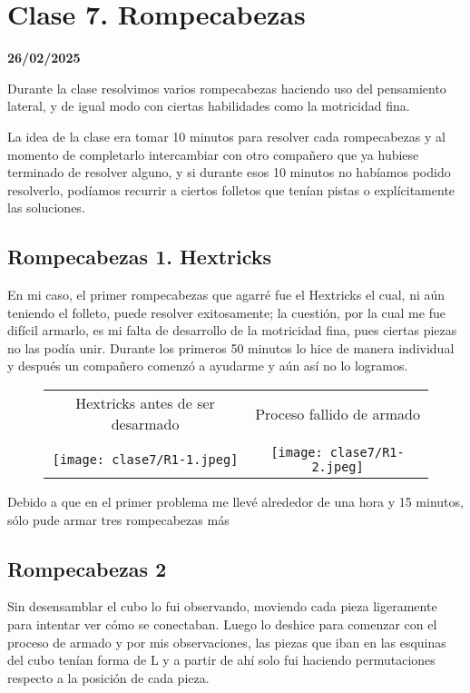 \chapter{Clase 7. Rompecabezas}
\textbf{26/02/2025}

Durante la clase resolvimos varios rompecabezas haciendo uso del pensamiento lateral, y de igual modo con ciertas habilidades como la motricidad fina. 

La idea de la clase era tomar 10 minutos para resolver cada rompecabezas y al momento de completarlo intercambiar con otro compañero que ya hubiese terminado de resolver alguno, y si durante esos 10 minutos no habíamos podido resolverlo, podíamos recurrir a ciertos folletos que tenían pistas o explícitamente las soluciones. 

\section{Rompecabezas 1. Hextricks}

En mi caso, el primer rompecabezas que agarré fue el Hextricks el cual, ni aún teniendo el folleto, puede resolver exitosamente; la cuestión, por la cual me fue difícil armarlo, es mi falta de desarrollo de la motricidad fina, pues ciertas piezas no las podía unir. Durante los primeros 50 minutos lo hice de manera individual y después un compañero comenzó a ayudarme y aún así no lo logramos.

\begin{figure}[H]
    \begin{tabular}{cc}
        Hextricks antes de ser desarmado & Proceso fallido de armado\\\\
        \texttt{[image: clase7/R1-1.jpeg]}&\texttt{[image: clase7/R1-2.jpeg]}
    \end{tabular}
    \caption{}
\end{figure}

Debido a que en el primer problema me llevé alrededor de una hora y 15 minutos, sólo pude armar tres rompecabezas más

\section{Rompecabezas 2}

Sin desensamblar el cubo lo fui observando, moviendo cada pieza ligeramente para intentar ver cómo se conectaban. Luego lo deshice para comenzar con el proceso de armado y por mis observaciones, las piezas que iban en las esquinas del cubo tenían forma de L y a partir de ahí solo fui haciendo permutaciones respecto a la posición de cada pieza.

